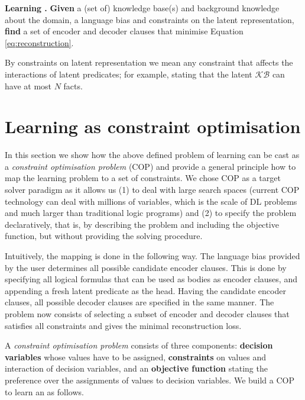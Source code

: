 \begin{definition}
\textbf{Learning .}
\textbf{Given} a (set of) knowledge base(s) and background knowledge about the domain, a language bias and constraints on the latent representation, \textbf{find} a set of encoder and decoder clauses that minimise Equation \ref{eq:reconstruction}.
\end{definition}

By constraints on latent representation we mean any constraint that affects the interactions of latent predicates; for example, stating that the latent $\mathcal{KB}$ can have at most $N$ facts.



\section{Learning as constraint optimisation}

In this section we show how the above defined problem of learning  can be cast as a \textit{constraint optimisation problem} (COP) \cite{Rossi:2006:HCP:1207782} and provide a general principle how to map the learning problem to a set of constraints.
We chose COP as a target solver paradigm as it allows us (1) to deal with large search spaces (current COP technology can deal with millions of variables, which is the scale of DL problems and much larger than traditional logic programs) and (2) to specify the problem declaratively, that is, by describing the problem and including the objective function, but without providing the solving procedure.


Intuitively, the mapping is done in the following way.
The language bias provided by the user determines all possible candidate encoder clauses. This is done by specifying all logical formulas that can be used as bodies as encoder clauses, and appending a fresh latent predicate as the head.
Having the candidate encoder clauses, all possible decoder clauses are specified in the same manner.
The problem now consists of selecting a subset of encoder and decoder clauses that satisfies all constraints and gives the minimal reconstruction loss.



A \textit{constraint optimisation problem} consists of three components: \textbf{decision variables} whose values have to be assigned, \textbf{constraints} on values and interaction of decision variables, and an \textbf{objective function} stating the preference over the assignments of values to decision variables. We build a COP to learn an \alp{}  as follows.


